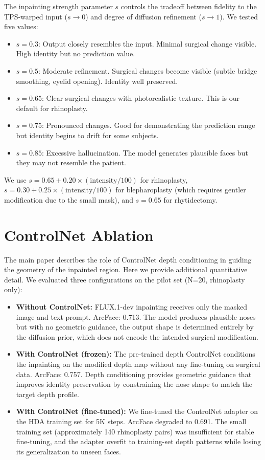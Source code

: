 \documentclass[10pt,twocolumn,letterpaper]{article}
\begin{document}
The inpainting strength parameter $s$ controls the tradeoff between
fidelity to the TPS-warped input ($s \to 0$) and degree of diffusion
refinement ($s \to 1$). We tested five values:

\begin{itemize}
  \item $s = 0.3$: Output closely resembles the input. Minimal surgical
    change visible. High identity but no prediction value.
  \item $s = 0.5$: Moderate refinement. Surgical changes become visible
    (subtle bridge smoothing, eyelid opening). Identity well preserved.
  \item $s = 0.65$: Clear surgical changes with photorealistic texture.
    This is our default for rhinoplasty.
  \item $s = 0.75$: Pronounced changes. Good for demonstrating the
    prediction range but identity begins to drift for some subjects.
  \item $s = 0.85$: Excessive hallucination. The model generates
    plausible faces but they may not resemble the patient.
\end{itemize}

We use $s = 0.65 + 0.20 \times (\text{intensity}/100)$ for rhinoplasty,
$s = 0.30 + 0.25 \times (\text{intensity}/100)$ for blepharoplasty
(which requires gentler modification due to the small mask), and $s =
0.65$ for rhytidectomy.

\section{ControlNet Ablation}

The main paper describes the role of ControlNet depth conditioning in
guiding the geometry of the inpainted region. Here we provide additional
quantitative detail. We evaluated three configurations on the pilot set
(N=20, rhinoplasty only):

\begin{itemize}
  \item \textbf{Without ControlNet:} FLUX.1-dev inpainting receives only
    the masked image and text prompt. ArcFace: 0.713. The model produces
    plausible noses but with no geometric guidance, the output shape is
    determined entirely by the diffusion prior, which does not encode the
    intended surgical modification.
  \item \textbf{With ControlNet (frozen):} The pre-trained depth
    ControlNet conditions the inpainting on the modified depth map without
    any fine-tuning on surgical data. ArcFace: 0.757. Depth conditioning
    provides geometric guidance that improves identity preservation by
    constraining the nose shape to match the target depth profile.
  \item \textbf{With ControlNet (fine-tuned):} We fine-tuned the
    ControlNet adapter on the HDA training set for 5K steps. ArcFace
    degraded to 0.691. The small training set (approximately 140
    rhinoplasty pairs) was insufficient for stable fine-tuning, and the
    adapter overfit to training-set depth patterns while losing its
    generalization to unseen faces.
\end{itemize}
\end{document}
